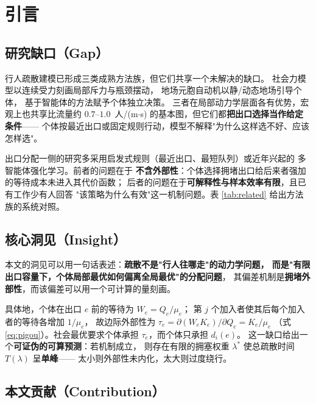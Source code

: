 \newpage

\section{引言}
\label{sec:intro}

\subsection{研究缺口（Gap）}
\label{sec:gap}

行人疏散建模已形成三类成熟方法族，但它们共享一个未解决的缺口。
社会力模型\cite{helbing1995socialforce}以连续受力刻画局部斥力与瓶颈摆动，
地场元胞自动机\cite{burstedde2001ca,kirchner2002friction}以静/动态地场引导个体，
基于智能体的方法赋予个体独立决策\cite{zheng2011stateofart}。
三者在局部动力学层面各有优势，宏观上也共享比流量约 $0.7$--$1.0$~人/(m$\cdot$s)
的基本图，但它们都\textbf{把出口选择当作给定条件}——
个体按最近出口或固定规则行动，模型不解释"为什么这样选不好、应该怎样选"。

出口分配一侧的研究多采用启发式规则（最近出口、最短队列）或近年兴起的
多智能体强化学习\cite{rashid2018qmix,yu2022mappo}。前者的问题在于
\textbf{不含外部性}：个体选择拥堵出口给后来者强加的等待成本未进入其代价函数；
后者的问题在于\textbf{可解释性与样本效率有限}，且已有工作少有人回答
"该策略为什么有效"这一机制问题。表 \ref{tab:related} 给出方法族的系统对照。

\subsection{核心洞见（Insight）}
\label{sec:insight}

本文的洞见可以用一句话表述：\textbf{疏散不是"行人往哪走"的动力学问题，
而是"有限出口容量下，个体局部最优如何偏离全局最优"的分配问题}，
其偏差机制是\textbf{拥堵外部性}，而该偏差可以用一个可计算的量刻画。

具体地，个体在出口 $e$ 前的等待为 $W_e=Q_e/\mu_e$；
第 $j$ 个加入者使其后每个加入者的等待各增加 $1/\mu_e$，
故边际外部性为 $\tau_e=\partial(W_eK_e)/\partial Q_e=K_e/\mu_e$
（式 \eqref{eq:pigou}）。社会最优要求个体承担 $\tau_e$，而个体只承担 $d_i(e)$。
这一缺口给出一个\textbf{可证伪的可算预测}：若机制成立，
则存在有限的拥塞权重 $\lambda^\ast$ 使总疏散时间 $T(\lambda)$ 呈\textbf{单峰}——
太小则外部性未内化，太大则过度绕行。

\subsection{本文贡献（Contribution）}
\label{sec:contrib}

